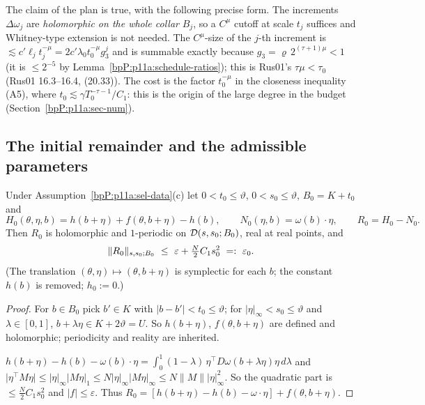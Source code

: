 \begin{remark}[Verdict on D-7]\label{bpP:p11a:d7-verdict}
The claim of the plan is true, with the following precise form. The increments $\Delta\omega_j$ are \emph{holomorphic on the whole collar} $B_j$, so a $C^\mu$ cutoff at scale $t_j$ suffices and Whitney-type extension is not needed. The $C^\mu$-size of the $j$-th increment is $\lesssim c'\ell_jt_j^{-\mu}=2c'\lambda_0t_0^{-\mu}g_3^j$ and is summable exactly because $g_3=\varrho\,2^{(\tau+1)\mu}<1$ (it is $\le2^{-5}$ by Lemma~\ref{bpP:p11a:schedule-ratios}); this is Rus01's $\tau\mu<\tau_0$ (Rus01 16.3--16.4, (20.33)). The cost is the factor $t_0^{-\mu}$ in the closeness inequality (A5), where $t_0\lesssim\gamma T_0^{-\tau-1}/C_1$: this is the origin of the large degree in the budget (Section~\ref{bpP:p11a:sec-num}).
\end{remark}

\subsection{The initial remainder and the admissible parameters}\label{bpP:p11a:sec-init}

\begin{lemma}\label{bpP:p11a:initial}
Under Assumption~\ref{bpP:p11a:sel-data}(c) let $0<t_0\le\vartheta$, $0<s_0\le\vartheta$, $B_0=K+t_0$ and
\[H_0(\theta,\eta,b)=h(b+\eta)+f(\theta,b+\eta)-h(b),\qquad N_0(\eta,b)=\omega(b)\cdot\eta,\qquad R_0=H_0-N_0 .\]
Then $R_0$ is holomorphic and $1$-periodic on $\mathcal D(s,s_0;B_0)$, real at real points, and
\[\nrmm{R_0}{s,s_0;B_0}\ \le\ \varepsilon+\tfrac N2C_1s_0^2\ =:\ \varepsilon_0 .\]
(The translation $(\theta,\eta)\mapsto(\theta,b+\eta)$ is symplectic for each $b$; the constant $h(b)$ is removed; $h_0:=0$.)
\end{lemma}
\begin{proof}
\label{stepP:p11a:in-dom} For $b\in B_0$ pick $b'\in K$ with $\lvert b-b'\rvert<t_0\le\vartheta$; for $\lvert\eta\rvert_\infty<s_0\le\vartheta$ and $\lambda\in[0,1]$, $b+\lambda\eta\in K+2\vartheta=U$. So $h(b+\eta)$, $f(\theta,b+\eta)$ are defined and holomorphic; periodicity and reality are inherited.

\label{stepP:p11a:in-taylor} $h(b+\eta)-h(b)-\omega(b)\cdot\eta=\int_0^1(1-\lambda)\,\eta^{\top}D\omega(b+\lambda\eta)\eta\,d\lambda$ and $\lvert\eta^{\top}M\eta\rvert\le\lvert\eta\rvert_\infty\lvert M\eta\rvert_1\le N\lvert\eta\rvert_\infty\lvert M\eta\rvert_\infty\le N\lVert M\rVert\lvert\eta\rvert_\infty^2$. So the quadratic part is $\le\frac N2C_1s_0^2$ and $\lvert f\rvert\le\varepsilon$. Thus $R_0=[h(b+\eta)-h(b)-\omega\cdot\eta]+f(\theta,b+\eta)$.
\end{proof}

